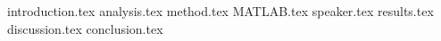 

{introduction.tex}
{analysis.tex}
{method.tex}
{MATLAB.tex}
{speaker.tex}
{results.tex}
{discussion.tex}
{conclusion.tex}


%
